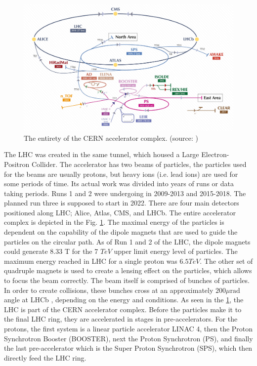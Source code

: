 \begin{figure}
  \centering
  \includegraphics[width=0.9\linewidth]{figures/chapter2/CERN_accelerator_complex.jpeg}
  \caption{The entirety of the CERN accelerator complex. (source: \cite{VandenBroeck:2693837})}
  \label{fig:cern_complex}
\end{figure}

The LHC was created in the same tunnel, which housed a Large Electron-Positron Collider.
The accelerator has two beams of particles, the particles used for the beams are usually protons, but heavy ions (i.e. lead ions) are used for some periods of time.
Its actual work was divided into years of runs or data taking periods. Runs 1 and 2 were undergoing in 2009-2013 and 2015-2018. The planned run three is supposed to start in 2022.
There are four main detectors positioned along LHC; Alice, Atlas, CMS, and LHCb.
The entire accelerator complex is depicted in the Fig. \ref{fig:cern_complex}.
The maximal energy of the particles is dependent on the capability of the dipole magnets that are used to guide the particles on the circular path.
As of Run 1 and 2 of the LHC, the dipole magnets could generate 8.33 T  \cite{Evans_2008} for the 7 $TeV$ upper limit energy level of particles.
The maximum energy reached in LHC for a single proton was $6.5 TeV$.
The other set of quadruple magnets is used to create a lensing effect on the particles, which allows to focus the beam correctly.
The beam itself is comprised of bunches of particles.
In order to create collisions, these bunches cross at an approximately $200 \mu \text{rad}$ angle at LHCb \cite{Holzer:1541986}, depending on the energy and conditions.
As seen in the \ref{fig:cern_complex}, the LHC is part of the CERN accelerator complex.
Before the particles make it to the final LHC ring, they are accelerated in stages in pre-accelerators.
For the protons, the first system is a linear particle accelerator LINAC 4, then the Proton Synchrotron Booster (BOOSTER), next the Proton Synchrotron (PS), and finally the last pre-accelerator which is the Super Proton Synchrotron (SPS), which then directly feed the LHC ring.


